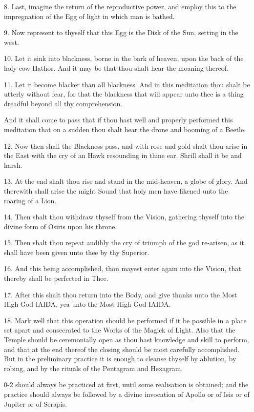 8. Last, imagine the return of the reproductive power, and employ this to the impregnation of the Egg of light in which man is bathed.

9. Now represent to thyself that this Egg is the Disk of the Sun, setting in the west.

10. Let it sink into blackness, borne in the bark of heaven, upon the back of the holy cow Hathor. And it may be that thou shalt hear the moaning thereof.

11. Let it become blacker than all blackness. And in this meditation thou shalt be utterly without fear, for that the blackness that will appear unto thee is a thing dreadful beyond all thy comprehension.

And it shall come to pass that if thou hast well and properly performed this meditation that on a sudden thou shalt hear the drone and booming of a Beetle.

12. Now then shall the Blackness pass, and with rose and gold shalt thou arise in the East with the cry of an Hawk resounding in thine ear. Shrill shall it be and harsh.

13. At the end shalt thou rise and stand in the mid-heaven, a globe of glory. And therewith shall arise the might Sound that holy men have likened unto the roaring of a Lion.

14. Then shalt thou withdraw thyself from the Vision, gathering thyself into the divine form of Osiris upon his throne.

15. Then shalt thou repeat audibly the cry of triumph of the god re-arisen, as it shall have been given unto thee by thy Superior.

16. And this being accomplished, thou mayest enter again into the Vision, that thereby shall be perfected in Thee.

17. After this shalt thou return into the Body, and give thanks unto the Most High God IAIDA, yea unto the Most High God IAIDA.

18. Mark well that this operation should be performed if it be possible in a place set apart and consecrated to the Works of the Magick of Light. Also that the Temple should be ceremonially open as thou hast knowledge and skill to perform, and that at the end thereof the closing should be most carefully accomplished. But in the preliminary practice it is enough to cleanse thyself by ablution, by robing, and by the rituals of the Pentagram and Hexagram.

0-2 should always be practiced at first, until some realisation is obtained; and the practice should always be followed by a divine invocation of Apollo or of Isis or of Jupiter or of Serapis.

